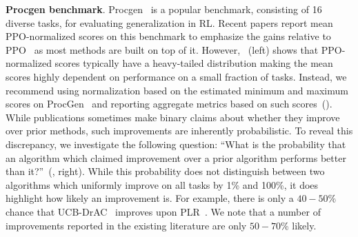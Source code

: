 \textbf{Procgen benchmark}. Procgen~\citep{cobbe2020leveraging} is a popular benchmark, consisting of 16 diverse tasks, for evaluating generalization in RL. 
Recent papers report mean PPO-normalized scores on this benchmark to emphasize the gains relative to PPO~\citep{schulman2017proximal} as most methods are built on top of it. However, ~(left) shows that PPO-normalized scores typically have a heavy-tailed distribution making the mean scores highly dependent on performance on a small fraction of tasks. 
Instead, we recommend using normalization based on the estimated minimum and maximum scores on ProcGen~\citep{cobbe2020leveraging} and reporting aggregate metrics based on such scores~().
While publications sometimes make binary claims about whether they improve over prior methods, such improvements are inherently probabilistic. To reveal this discrepancy, we investigate the following
question: ``What is the probability that an algorithm which claimed improvement over a prior algorithm performs better than it?''~(, right). While this probability does not distinguish between two algorithms which uniformly improve on all tasks by 1\% and 100\%, it does highlight how likely an improvement is. For example, there is only a $40-50$\% chance that UCB-DrAC~\citep{raileanu2020automatic} improves upon PLR~\citep{jiang2020prioritized}. We note that a number of improvements reported in the existing literature are only $50-70$\% likely. 